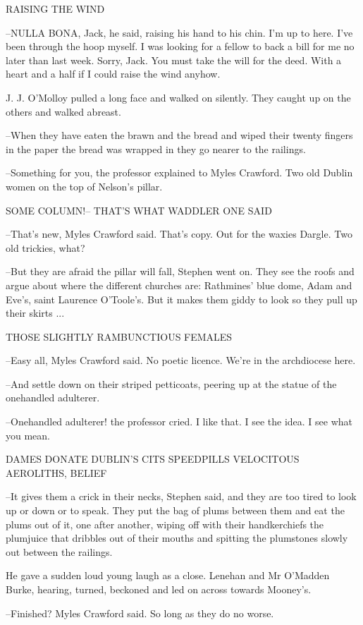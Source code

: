     RAISING THE WIND


--NULLA BONA, Jack, he said, raising his hand to his chin. I'm up to
here. I've been through the hoop myself. I was looking for a fellow to
back a bill for me no later than last week. Sorry, Jack. You must take the
will for the deed. With a heart and a half if I could raise the wind
anyhow.

J. J. O'Molloy pulled a long face and walked on silently. They caught
up on the others and walked abreast.

--When they have eaten the brawn and the bread and wiped their twenty
fingers in the paper the bread was wrapped in they go nearer to the
railings.

--Something for you, the professor explained to Myles Crawford. Two old
Dublin women on the top of Nelson's pillar.


    SOME COLUMN!--
    THAT'S WHAT WADDLER ONE SAID


--That's new, Myles Crawford said. That's copy. Out for the waxies
Dargle. Two old trickies, what?

--But they are afraid the pillar will fall, Stephen went on. They see the
roofs and argue about where the different churches are: Rathmines' blue
dome, Adam and Eve's, saint Laurence O'Toole's. But it makes them giddy to
look so they pull up their skirts ...


    THOSE SLIGHTLY RAMBUNCTIOUS FEMALES


--Easy all, Myles Crawford said. No poetic licence. We're in the
archdiocese here.

--And settle down on their striped petticoats, peering up at the statue
of the onehandled adulterer.

--Onehandled adulterer! the professor cried. I like that. I see the idea.
I see what you mean.


    DAMES DONATE DUBLIN'S CITS SPEEDPILLS
    VELOCITOUS AEROLITHS, BELIEF


--It gives them a crick in their necks, Stephen said, and they are too
tired to look up or down or to speak. They put the bag of plums between
them and eat the plums out of it, one after another, wiping off with their
handkerchiefs the plumjuice that dribbles out of their mouths and spitting
the plumstones slowly out between the railings.

He gave a sudden loud young laugh as a close. Lenehan and Mr O'Madden
Burke, hearing, turned, beckoned and led on across towards Mooney's.

--Finished? Myles Crawford said. So long as they do no worse.


